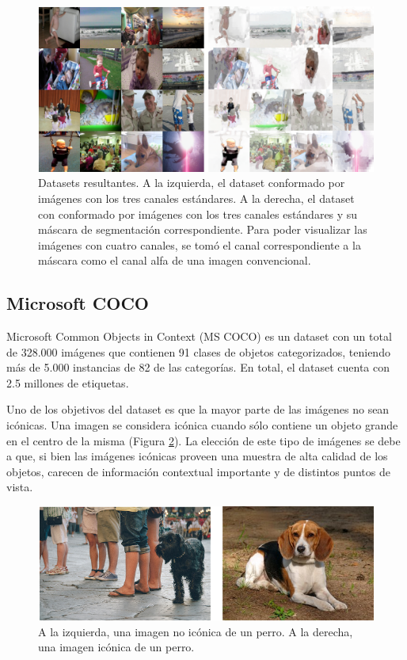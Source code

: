 \documentclass[spanish]{report}
\begin{document}
\begin{figure}[H]
\centering
 \includegraphics[width=\linewidth]{comparacion_datasets_normales.png}
   \caption{Datasets resultantes. A la izquierda, el dataset conformado por imágenes con los tres canales estándares. A la derecha, el dataset con conformado por imágenes con los tres canales estándares y su máscara de segmentación correspondiente. Para poder visualizar las imágenes con cuatro canales, se tomó el canal correspondiente a la máscara como el canal alfa de una imagen convencional.}
  \label{fig:comparacion_datasets_normales}
\end{figure}


\subsection{Microsoft COCO}

Microsoft Common Objects in Context (MS COCO) \cite{coco} es un dataset con un total de 328.000 imágenes que contienen 91 clases de objetos categorizados, teniendo más de 5.000 instancias de 82 de las categorías. En total, el dataset cuenta con 2.5 millones de etiquetas.

Uno de los objetivos del dataset es que la mayor parte de las imágenes no sean icónicas. Una imagen se considera icónica cuando sólo contiene un objeto grande en el centro de la misma (Figura \ref{fig:iconic_vs_noiconic}). La elección de este tipo de imágenes se debe a que, si bien las imágenes icónicas proveen una muestra de alta calidad de los objetos, carecen de información contextual importante y de distintos puntos de vista.

\begin{figure}[H]
\centering
 \includegraphics[width=\linewidth]{iconic_vs_noiconic.png}
   \caption{A la izquierda, una imagen no icónica de un perro. A la derecha, una imagen icónica de un perro.}
  \label{fig:iconic_vs_noiconic}
\end{figure}
\end{document}
